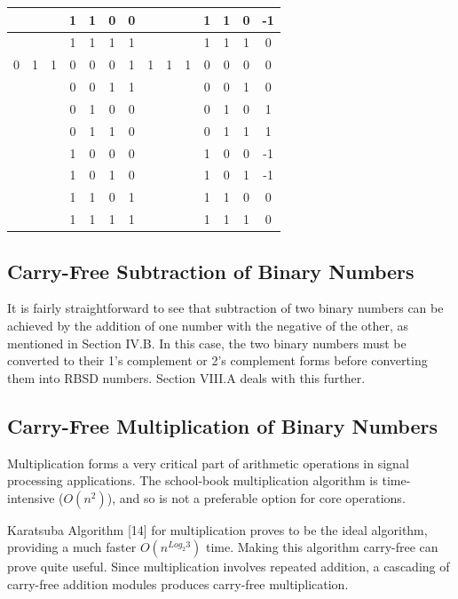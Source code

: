 \documentclass[conference]{IEEEtran_NCC}
\begin{document}
\begin{table}[h!]
\begin{tabular}{|c|c|c|c|c|c||c|||c|c|c|c|c|c||c|}
    \hline
    & & & 1 & 1 & 0 & 0  &  & & & 1 & 1 & 0 & -1 \\
    \hline
    & & & 1 & 1 & 1 & 1  &  & & & 1 & 1 & 1 & 0 \\
    \hline
    0 & 1 & 1 & 0 & 0 & 0 & 1  &  1 & 1 & 1 & 0 & 0 & 0 & 0 \\
    \hline
    & & & 0 & 0 & 1 & 1  &  & & & 0 & 0 & 1 & 0 \\
    \hline
    & & & 0 & 1 & 0 & 0  &  & & & 0 & 1 & 0 & 1 \\
    \hline
    & & & 0 & 1 & 1 & 0  &  & & & 0 & 1 & 1 & 1 \\
    \hline
    & & & 1 & 0 & 0 & 0  &  & & & 1 & 0 & 0 & -1 \\
    \hline
    & & & 1 & 0 & 1 & 0  &  & & & 1 & 0 & 1 & -1 \\
    \hline
    & & & 1 & 1 & 0 & 1  &  & & & 1 & 1 & 0 & 0 \\
    \hline
    & & & 1 & 1 & 1 & 1  &  & & & 1 & 1 & 1 & 0 \\
    \hline
  \end{tabular}
\end{table}

\subsection{Carry-Free Subtraction of Binary Numbers}

It is fairly straightforward to see that subtraction of two binary numbers can be achieved by the addition of one number with the negative of the other, as mentioned in Section IV.B. In this case, the two binary numbers must be converted to their 1’s complement or 2’s complement forms before converting them into RBSD numbers. Section VIII.A deals with this further.

\subsection{Carry-Free Multiplication of Binary Numbers}

Multiplication forms a very critical part of arithmetic operations in signal processing applications. The school-book multiplication algorithm is time-intensive ($O(n^{2})$), and so is not a preferable option for core operations.

Karatsuba Algorithm [14] for multiplication proves to be the ideal algorithm, providing a much faster $O(n^{Log_{2}3})$ time. Making this algorithm carry-free can prove quite useful. Since multiplication involves repeated addition, a cascading of carry-free addition modules produces carry-free multiplication.
\end{document}

